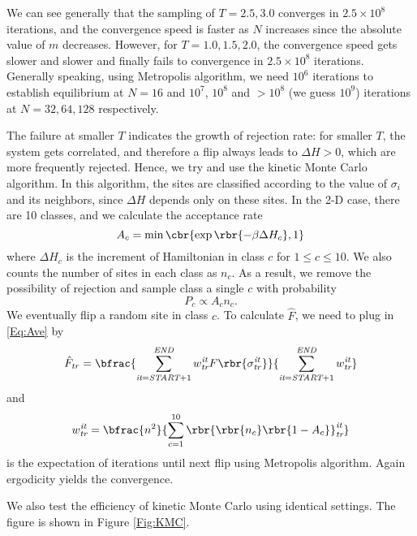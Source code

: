 \documentclass[english, nochinese]{pnote}
\begin{document}
We can see generally that the sampling of $ T = 2.5, 3.0 $ converges in $ 2.5 \times 10^8 $ iterations, and the convergence speed is faster as $N$ increases since the absolute value of $m$ decreases. However, for $ T = 1.0, 1.5, 2.0 $, the convergence speed gets slower and slower and finally fails to convergence in $ 2.5 \times 10^8 $ iterations. Generally speaking, using Metropolis algorithm, we need $10^6$ iterations to establish equilibrium at $ N = 16 $ and $10^7$, $10^8$ and $ > 10^8 $ (we guess $10^9$) iterations at $ N = 32, 64, 128 $ respectively.

The failure at smaller $T$ indicates the growth of rejection rate: for smaller $T$, the system gets correlated, and therefore a flip always leads to $ \Delta H > 0 $, which are more frequently rejected. Hence, we try and use the kinetic Monte Carlo algorithm. In this algorithm, the sites are classified according to the value of $\sigma_i$ and its neighbors, since $ \Delta H $ depends only on these sites. In the 2-D case, there are 10 classes, and we calculate the acceptance rate
\begin{equation}
A_c = \min \cbr{ \exp \rbr{ -\beta \Delta H_c }, 1 }
\end{equation}
where $ \Delta H_c $ is the increment of Hamiltonian in class $c$ for $ 1 \le c \le 10 $. We also counts the number of sites in each class as $n_c$. As a result, we remove the possibility of rejection and sample class a single $c$ with probability
\begin{equation}
P_c \propto A_c n_c.
\end{equation}
We eventually flip a random site in class $c$. To calculate $\hat{F}$, we need to plug in \eqref{Eq:Ave} by
\begin{equation}
\hat{F}_{\mathit{tr}} = \bfrac{ \sum_{ \textit{it} = \textit{START} + 1 }^{\textit{END}} w_{\textit{tr}}^{\textit{it}} F \rbr{\sigma_{\mathit{tr}}^{\mathit{it}} } }{ \sum_{ \textit{it} = \textit{START} + 1 }^{\textit{END}} w_{\textit{tr}}^{\textit{it}} }
\end{equation}
and
\begin{equation}
w_{\textit{tr}}^{\textit{it}} = \bfrac{n^2}{ \sum_{ c = 1 }^{10} \rbr{ \rbr{n_c} \rbr{ 1 - A_c } }_{\textit{tr}}^{\textit{it}} }
\end{equation}
is the expectation of iterations until next flip using Metropolis algorithm. Again ergodicity yields the convergence.

We also test the efficiency of kinetic Monte Carlo using identical settings. The figure is shown in Figure \ref{Fig:KMC}.
\end{document}
